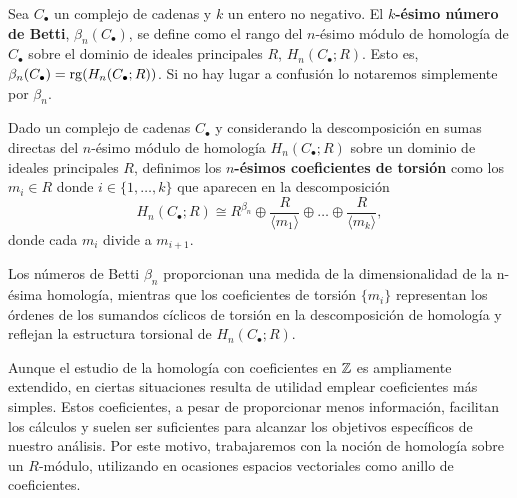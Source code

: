 \begin{definicion}
	Sea \(C_{\bullet}\) un complejo de cadenas y \(k\) un entero no negativo. El
	\textbf{\(k\)-ésimo número de Betti}, \(\beta_{n}(C_{\bullet})\), se define como el
	rango del \(n\)-ésimo módulo de homología de \(C_{\bullet}\) sobre el dominio de ideales
	principales \(R\), \(H_{n}(C_{\bullet};R)\). Esto es,
	\(\beta_{n}(C_{\bullet}) = \operatorname{rg}(H_{n}(C_{\bullet};R))\). Si no hay lugar a confusión
	lo notaremos simplemente por \(\beta_{n}\).
\end{definicion}

\begin{definicion}
	Dado un complejo de cadenas \(C_{\bullet}\) y considerando la descomposición en sumas
	directas del \(n\)-ésimo módulo de homología \(H_{n}(C_{\bullet};R)\) sobre un dominio
	de ideales principales \(R\), definimos los \textbf{\(n\)-ésimos coeficientes de
		torsión} como los \(m_{i} \in R\) donde \(i \in \{1, \ldots, k\}\) que aparecen en
	la descomposición
	\[
	H_{n}(C_{\bullet};R) \cong R^{\beta_n}\oplus \frac{R}{\langle m_{1} \rangle}\oplus
	\ldots \oplus \frac{R}{\langle m_{k} \rangle},
	\]
	donde cada \(m_{i}\) divide a \(m_{i+1}\).
\end{definicion}

Los números de Betti \(\beta_{n}\) proporcionan una medida de la dimensionalidad
de la n-ésima homología, mientras que los coeficientes de torsión \(\{m_{i}\}\) representan
los órdenes de los sumandos cíclicos de torsión en la descomposición de homología
y reflejan la estructura torsional de \(H_{n}(C_{\bullet};R)\).

Aunque el estudio de la homología con coeficientes en \(\mathbb{Z}\) es ampliamente extendido,
en ciertas situaciones resulta de utilidad emplear coeficientes más simples. Estos
coeficientes, a pesar de proporcionar menos información, facilitan los cálculos y
suelen ser suficientes para alcanzar los objetivos específicos de nuestro análisis.
Por este motivo, trabajaremos con la noción de homología sobre un \(R\)-módulo,
utilizando en ocasiones espacios vectoriales como anillo de coeficientes.

\endinput
